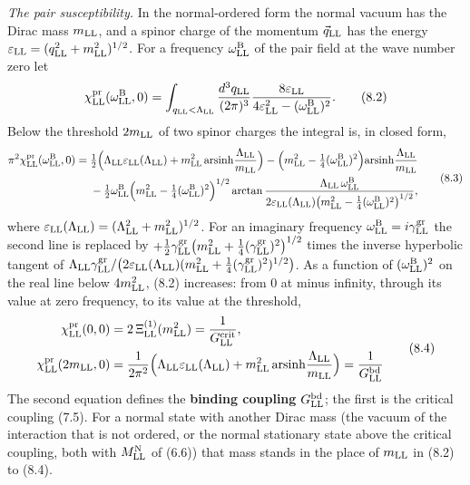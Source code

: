 \documentclass[
  10pt,
]{article}
\begin{document}
\emph{The pair susceptibility.} In the normal-ordered form the normal
vacuum has the Dirac mass \(m_{\rm LL}\), and a spinor charge of the
momentum \(\vec q_{\rm LL}\) has the energy
\(\varepsilon_{\rm LL}=(q_{\rm LL}^2+m_{\rm LL}^2)^{1/2}\). For a
frequency \(\omega^{\rm B}_{\rm LL}\) of the pair field at the wave
number zero let
\[\chi^{\rm pr}_{\rm LL}(\omega^{\rm B}_{\rm LL},0)=\int_{q_{\rm LL}<\Lambda_{\rm LL}}\frac{d^3q_{\rm LL}}{(2\pi)^3}\frac{8\varepsilon_{\rm LL}}{4\varepsilon_{\rm LL}^2-(\omega^{\rm B}_{\rm LL})^2}.\tag{8.2}\]
Below the threshold \(2m_{\rm LL}\) of two spinor charges the integral
is, in closed form,
\[\begin{aligned}\pi^2\chi^{\rm pr}_{\rm LL}(\omega^{\rm B}_{\rm LL},0)={}&\tfrac12\Big(\Lambda_{\rm LL}\varepsilon_{\rm LL}(\Lambda_{\rm LL})+m_{\rm LL}^2\,\mathrm{arsinh}\frac{\Lambda_{\rm LL}}{m_{\rm LL}}\Big)
-\Big(m_{\rm LL}^2-\tfrac14(\omega^{\rm B}_{\rm LL})^2\Big)\mathrm{arsinh}\frac{\Lambda_{\rm LL}}{m_{\rm LL}}\\
&-\tfrac12\omega^{\rm B}_{\rm LL}\Big(m_{\rm LL}^2-\tfrac14(\omega^{\rm B}_{\rm LL})^2\Big)^{1/2}\arctan\frac{\Lambda_{\rm LL}\,\omega^{\rm B}_{\rm LL}}{2\varepsilon_{\rm LL}(\Lambda_{\rm LL})\big(m_{\rm LL}^2-\tfrac14(\omega^{\rm B}_{\rm LL})^2\big)^{1/2}},\end{aligned}\tag{8.3}\]
where
\(\varepsilon_{\rm LL}(\Lambda_{\rm LL})=(\Lambda_{\rm LL}^2+m_{\rm LL}^2)^{1/2}\).
For an imaginary frequency
\(\omega^{\rm B}_{\rm LL}=i\gamma^{\rm gr}_{\rm LL}\) the second line is
replaced by
\(+\tfrac12\gamma^{\rm gr}_{\rm LL}\big(m_{\rm LL}^2+\tfrac14(\gamma^{\rm gr}_{\rm LL})^2\big)^{1/2}\)
times the inverse hyperbolic tangent of
\(\Lambda_{\rm LL}\gamma^{\rm gr}_{\rm LL}/\big(2\varepsilon_{\rm LL}(\Lambda_{\rm LL})(m_{\rm LL}^2+\tfrac14(\gamma^{\rm gr}_{\rm LL})^2)^{1/2}\big)\).
As a function of \((\omega^{\rm B}_{\rm LL})^2\) on the real line below
\(4m_{\rm LL}^2\), (8.2) increases: from 0 at minus infinity, through
its value at zero frequency, to its value at the threshold,
\[\begin{aligned}\chi^{\rm pr}_{\rm LL}(0,0)&=2\,\Xi^{(1)}_{\rm LL}(m_{\rm LL}^2)=\frac1{G^{\rm crit}_{\rm LL}},\\
\chi^{\rm pr}_{\rm LL}(2m_{\rm LL},0)&=\frac1{2\pi^2}\Big(\Lambda_{\rm LL}\varepsilon_{\rm LL}(\Lambda_{\rm LL})+m_{\rm LL}^2\,\mathrm{arsinh}\frac{\Lambda_{\rm LL}}{m_{\rm LL}}\Big)=\frac1{G^{\rm bd}_{\rm LL}}\end{aligned}\tag{8.4}\]
The second equation defines the \textbf{binding coupling}
\(G^{\rm bd}_{\rm LL}\); the first is the critical coupling (7.5). For a
normal state with another Dirac mass (the vacuum of the interaction that
is not ordered, or the normal stationary state above the critical
coupling, both with \(M^{\rm N}_{\rm LL}\) of (6.6)) that mass stands in
the place of \(m_{\rm LL}\) in (8.2) to (8.4).
\end{document}
